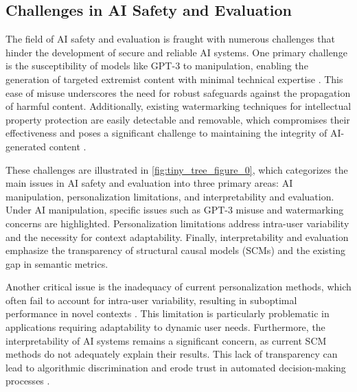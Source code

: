
 






\subsection{Challenges in AI Safety and Evaluation} \label{subsec:Challenges in AI Safety and Evaluation}

The field of AI safety and evaluation is fraught with numerous challenges that hinder the development of secure and reliable AI systems. One primary challenge is the susceptibility of models like GPT-3 to manipulation, enabling the generation of targeted extremist content with minimal technical expertise \cite{mcguffie2020radicalizationrisksgpt3advanced}. This ease of misuse underscores the need for robust safeguards against the propagation of harmful content. Additionally, existing watermarking techniques for intellectual property protection are easily detectable and removable, which compromises their effectiveness and poses a significant challenge to maintaining the integrity of AI-generated content \cite{wang2024espewrobustcopyrightprotection}.

These challenges are illustrated in \autoref{fig:tiny_tree_figure_0}, which categorizes the main issues in AI safety and evaluation into three primary areas: AI manipulation, personalization limitations, and interpretability and evaluation. Under AI manipulation, specific issues such as GPT-3 misuse and watermarking concerns are highlighted. Personalization limitations address intra-user variability and the necessity for context adaptability. Finally, interpretability and evaluation emphasize the transparency of structural causal models (SCMs) and the existing gap in semantic metrics.

Another critical issue is the inadequacy of current personalization methods, which often fail to account for intra-user variability, resulting in suboptimal performance in novel contexts \cite{kaur2024cropcontextwiserobuststatic}. This limitation is particularly problematic in applications requiring adaptability to dynamic user needs. Furthermore, the interpretability of AI systems remains a significant concern, as current SCM methods do not adequately explain their results. This lack of transparency can lead to algorithmic discrimination and erode trust in automated decision-making processes \cite{lin2023interpretabilityframeworksimilarcase}.

